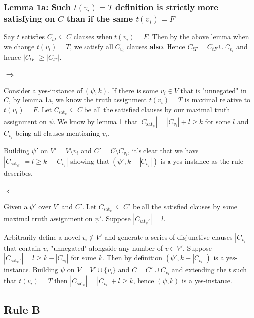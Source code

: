 \documentclass{article}
\begin{document}
\subsubsection*{Lemma 1a: Such $t(v_i) = T$ definition is strictly more satisfying on $C$ than if the same $t(v_i) = F$}
Say $t$ satisfies $C_{tF} \subseteq C$ clauses when $t(v_i) = F$. Then by the above lemma when we change $t(v_i)=T$, we satisfy all $C_{v_i}$ clauses {\bf also}. Hence $C_{tT}$ = $C_{tF} \cup C_{v_i}$ and hence $|C_{tF}| \geq |C_{tT}|$.

\subsubsection*{$\Rightarrow$}

Consider a yes-instance of $(\psi, k)$. If there is some $v_i \in V$ that is "unnegated" in $C$, by lemma 1a, we know the truth assignment $t(v_i)=T$ is maximal relative to $t(v_i)=F$. Let $C_{\text{sat}_\psi} \subseteq C$ be all the satisfied clauses by our maximal truth assignment on $\psi$. We know by lemma 1 that $|C_{\text{sat}_\psi}| = |C_{v_i}| + l \geq k$ for some $l$ and $C_{v_i}$ being all clauses mentioning $v_i$.

Building $\psi'$ on $V'=V \setminus {v_i}$ and $C'=C \setminus C_{v_i}$, it's clear that we have $|C_{\text{sat}_{\psi'}}| = l \geq k - |C_{v_i}|$ showing that $(\psi', k - |C_{v_i}|)$ is a yes-instance as the rule describes.

\subsubsection*{$\Leftarrow$}
Given a $\psi'$ over $V'$ and $C'$. Let $C_{\text{sat}_\psi'} \subseteq C'$ be all the satisfied clauses by some maximal truth assignment on $\psi'$. Suppose $|C_{\text{sat}_\psi'}| = l$.

Arbitrarily define a novel $v_i \not\in V'$ and generate a series of disjunctive clauses $|C_{v_i}|$ that contain $v_i$ "unnegated" alongside any number of $v \in V'$. Suppose $|C_{\text{sat}_\psi'}| = l \geq k - |C_{v_i}|$ for some $k$. Then by definition $(\psi', k - |C_{v_i}|)$ is a yes-instance. Building $\psi$ on $V = V' \cup \{v_i\}$ and $C = C' \cup {C_{v_i}}$ and extending the $t$ such that $t(v_i)=T$ then $|C_{\text{sat}_\psi}| = |C_{v_i}| + l \geq k$, hence $(\psi, k)$ is a yes-instance.

\subsection*{Rule B}
\end{document}
